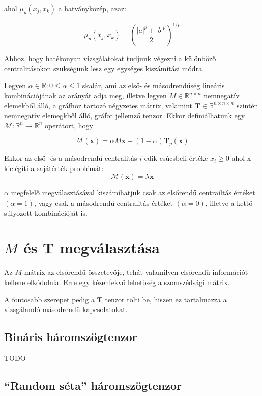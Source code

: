 \documentclass[12pt,numbers=noenddot]{report}
\begin{document}
ahol $\mu_p(x_j,x_k)$ a hatványközép, azaz:

$$\mu_p(x_j,x_k) = \left(\frac{|a|^p+|b|^p}{2}\right)^{1/p}$$


Ahhoz, hogy hatékonyan vizsgálatokat tudjunk végezni a különböző centralitásokon szükségünk lesz egy egységes kiszámítási módra.

Legyen $\alpha \in \mathbb{R}: 0 \leq \alpha \leq 1$ skalár, ami az első- és másodrendűség lineáris kombinációjának az arányát adja meg,
illetve legyen $M \in \mathbb{R}^{n \times n}$ nemnegatív elemekből álló, a gráfhoz tartozó négyzetes mátrix,
valamint $\boldsymbol{T} \in \mathbb{R}^{n \times n \times n}$ szintén nemnegatív elemegkből álló, gráfot jellemző tenzor.
Ekkor definiálhatunk egy $\mathcal{M}: \mathbb{R}^n \rightarrow \mathbb{R}^n$ operátort, hogy

$$\mathcal{M}(\boldsymbol{x}) = \alpha M \boldsymbol{x} + (1-\alpha) \boldsymbol{T}_p(\boldsymbol{x})$$

\noindent
Ekkor az első- és a másodrendű centralitás $i$-edik csúcsbeli értéke $x_i \geq 0$ ahol x kielégíti a sajátérték problémát:
$$\mathcal{M}(\boldsymbol{x}) = \lambda \boldsymbol{x}$$

\noindent
$\alpha$ megfelelő megválasztásával kiszámíhatjuk csak az elsőrendű centrailtás értéket $(\alpha = 1)$, 
vagy csak a másodrendű centralitás értéket $(\alpha = 0)$, illetve a kettő súlyozott kombinációját is.


\section{$M$ és $\boldsymbol{T}$ megválasztása}

Az $M$ mátrix az elsőrendű összetevője, tehát valamilyen elsőrendű információt kellene elkódolnia. 
Erre egy kézenfekvő lehetőség a szomszédsági mátrix.

A fontosabb szerepet pedig a $\boldsymbol{T}$ tenzor tölti be, hiszen ez tartalmazza a vizsgálandó másodrendű kapcsolatokat.

\subsection*{Bináris háromszögtenzor}

TODO

\subsection*{``Random séta'' háromszögtenzor}
\end{document}
